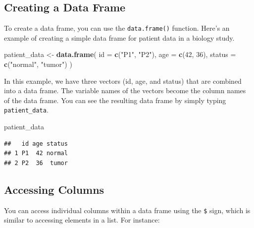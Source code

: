 \documentclass[
]{book}
\newenvironment{Shaded}{\begin{snugshade}}{\end{snugshade}}
\newcommand{\AttributeTok}[1]{\textcolor[rgb]{0.13,0.29,0.53}{#1}}
\newcommand{\DecValTok}[1]{\textcolor[rgb]{0.00,0.00,0.81}{#1}}
\newcommand{\FunctionTok}[1]{\textcolor[rgb]{0.13,0.29,0.53}{\textbf{#1}}}
\newcommand{\NormalTok}[1]{#1}
\newcommand{\OtherTok}[1]{\textcolor[rgb]{0.56,0.35,0.01}{#1}}
\newcommand{\SpecialCharTok}[1]{\textcolor[rgb]{0.81,0.36,0.00}{\textbf{#1}}}
\newcommand{\StringTok}[1]{\textcolor[rgb]{0.31,0.60,0.02}{#1}}
\begin{document}
\hypertarget{creating-a-data-frame}{%
\subsection{Creating a Data Frame}\label{creating-a-data-frame}}

To create a data frame, you can use the \texttt{data.frame()} function. Here's an example of creating a simple data frame for patient data in a biology study.

\begin{Shaded}
\begin{Highlighting}[]
\NormalTok{patient\_data }\OtherTok{\textless{}{-}} \FunctionTok{data.frame}\NormalTok{(}
  \AttributeTok{id =} \FunctionTok{c}\NormalTok{(}\StringTok{"P1"}\NormalTok{, }\StringTok{"P2"}\NormalTok{),}
  \AttributeTok{age =} \FunctionTok{c}\NormalTok{(}\DecValTok{42}\NormalTok{, }\DecValTok{36}\NormalTok{),}
  \AttributeTok{status =} \FunctionTok{c}\NormalTok{(}\StringTok{"normal"}\NormalTok{, }\StringTok{"tumor"}\NormalTok{)}
\NormalTok{)}
\end{Highlighting}
\end{Shaded}

In this example, we have three vectors (id, age, and status) that are combined into a data frame. The variable names of the vectors become the column names of the data frame. You can see the resulting data frame by simply typing \texttt{patient\_data}.

\begin{Shaded}
\begin{Highlighting}[]
\NormalTok{patient\_data}
\end{Highlighting}
\end{Shaded}

\begin{verbatim}
##   id age status
## 1 P1  42 normal
## 2 P2  36  tumor
\end{verbatim}

\hypertarget{accessing-columns}{%
\subsection{Accessing Columns}\label{accessing-columns}}

You can access individual columns within a data frame using the \texttt{\$} sign, which is similar to accessing elements in a list. For instance:

\begin{Shaded}
\end{Shaded}
\end{document}
